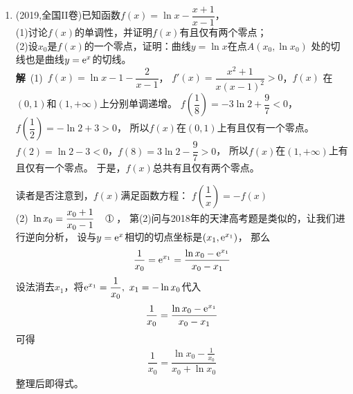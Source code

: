 \begin{enumerate}[label={\textbf{\arabic*.}},leftmargin=
    \inteval{\myenumleftmargin}pt]
综上，实数$ k $的最大值是2. \\
\textbf{注}\ 此题的背景显然是(\ref{ln(1+x)_(1-x)幂级数})式：
\begin{align*}
    \ln\dfrac{1+x}{1-x}=2\left(x+\dfrac{x^3}{3}+\dfrac{x^5}{5}+\cdots +\dfrac{x^{2k-1}}{2k-1} +\cdots \right)
\end{align*}

\item 
(2019,全国II卷)已知函数$ f(x)=\ln x-\dfrac{x+1}{x-1} $，\\
(1)讨论$ f(x) $的单调性，并证明$ f(x) $有且仅有两个零点；\\
(2)设$ x_0 $是$ f(x) $的一个零点，证明：曲线$ y=\ln x $在点$ A(x_0,\ln x_0) $
处的切线也是曲线$ y=\mathrm{e}^x $的切线。\\
\textbf{解}\ (1)\ $ f(x)=\ln x-1-\dfrac{2}{x-1} $，
$ f'(x)=\dfrac{x^2+1}{x(x-1)^2}>0 $，$ f(x) $
在$ (0,1) $和$ (1,+\infty) $上分别单调递增。
$ f\left(\dfrac{1}{8}\right)=-3\ln 2+\dfrac{9}{7}<0 $，
$ f\left(\dfrac{1}{2}\right)=-\ln2+3>0 $，
所以$ f(x) $在$ (0,1) $上有且仅有一个零点。
$ f(2)=\ln 2-3<0 $，$ f(8)=3\ln 2-\dfrac{9}{7}>0 $，
所以$ f(x) $在$ (1,+\infty) $上有且仅有一个零点。
于是，$ f(x) $总共有且仅有两个零点。

读者是否注意到，$ f(x) $满足函数方程：
$ f\left(\dfrac{1}{x}\right)=-f(x) $ \\
(2)\ $ \ln x_0=\dfrac{x_0+1}{x_0-1}\q \mycircled{1} $，
第(2)问与2018年的天津高考题是类似的，让我们进行逆向分析，
设与$ y=\mathrm{e}^x $相切的切点坐标是$ (x_1,\mathrm{e}^{x_1}) $，
那么
\begin{gather*}
    \dfrac{1}{x_0}=\mathrm{e}^{x_1}=\dfrac{\ln x_0-\mathrm{e}^{x_1}}{x_0-x_1}
\end{gather*}
设法消去$ x_1 $，将$ \mathrm{e}^{x_1}=\dfrac{1}{x_0},\ x_1=-\ln x_0 $代入
\begin{gather*}
    \dfrac{1}{x_0}=\dfrac{\ln x_0-\mathrm{e}^{x_1}}{x_0-x_1}
\end{gather*}
可得
\begin{gather*}
    \dfrac{1}{x_0}=\dfrac{\ln x_0-\frac{1}{x_0}}{x_0+\ln x_0}
\end{gather*}
整理后即得式。


\end{enumerate}
